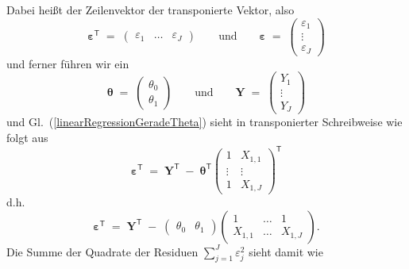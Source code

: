 Dabei heißt der Zeilenvektor der transponierte Vektor, also
\begin{equation}
\boldsymbol{\varepsilon}^\mathsf{T} \; = \; \left(\begin{array}{ccc}
\varepsilon_1 & \dots & \varepsilon_J
\end{array}
\right) \qquad \mathrm{und}  \qquad 
\boldsymbol{\varepsilon} \; = \; \left(
\begin{array}{c}
\varepsilon_1\\
\vdots \\
\varepsilon_J
\end{array}
\right)
\end{equation}
und ferner führen wir ein
\begin{equation}
\boldsymbol{\theta} \; = \;
\left(
\begin{array}{c}
\theta_0\\
\theta_1
\end{array}
\right) \qquad \mathrm{und}  \qquad 
\mathbf{Y}  \; = \;\left(
\begin{array}{c}
Y_{1}\\
\vdots \\
Y_{J}
\end{array}
\right) 
\end{equation}
und Gl.~(\ref{linearRegressionGeradeTheta}) sieht in transponierter Schreibweise
wie folgt aus
\begin{equation}
\boldsymbol{\varepsilon}^\mathsf{T} \; = \;
\mathbf{Y}^\mathsf{T}
\; - \; 
\boldsymbol{\theta}^\mathsf{T} \left(
\begin{array}{cc}
1 &  X_{1,1} \\
\vdots & \vdots\\
1 & X_{1,J} 
\end{array}
\right)^\mathsf{T} 
\label{linearRegressionGeradeTransponiert}
\end{equation}
d.h.
\begin{equation}
\boldsymbol{\varepsilon}^\mathsf{T} \; = \;
\mathbf{Y}^\mathsf{T}
\; - \; 
\left(
\begin{array}{cc}
\theta_0 &
\theta_1
\end{array}
\right) \left(
\begin{array}{ccc}
1 &  \dots & 1 \\
X_{1,1} & \dots & X_{1,J} 
\end{array}
\right).
\label{linearRegressionGeradeUmform}
\end{equation}
Die Summe der Quadrate der Residuen $\sum_{j=1}^J \varepsilon_j^2$  sieht damit wie
